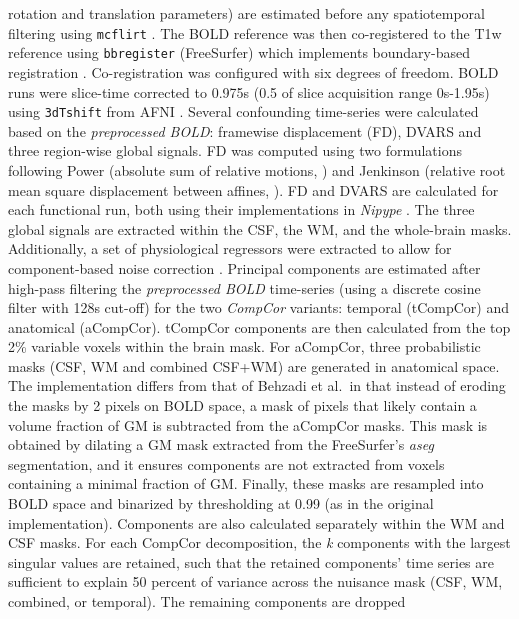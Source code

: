 \documentclass[
]{article}
\begin{document}
\begin{description}
rotation and translation parameters) are estimated before any
spatiotemporal filtering using \texttt{mcflirt} \citep[FSL
,][]{mcflirt}. The BOLD reference was then co-registered to the T1w
reference using \texttt{bbregister} (FreeSurfer) which implements
boundary-based registration \citep{bbr}. Co-registration was configured
with six degrees of freedom. BOLD runs were slice-time corrected to
0.975s (0.5 of slice acquisition range 0s-1.95s) using \texttt{3dTshift}
from AFNI \citep[RRID:SCR\_005927]{afni}. Several confounding
time-series were calculated based on the \emph{preprocessed BOLD}:
framewise displacement (FD), DVARS and three region-wise global signals.
FD was computed using two formulations following Power (absolute sum of
relative motions, \citet{power_fd_dvars}) and Jenkinson (relative root
mean square displacement between affines, \citet{mcflirt}). FD and DVARS
are calculated for each functional run, both using their implementations
in \emph{Nipype} \citep[following the definitions by][]{power_fd_dvars}.
The three global signals are extracted within the CSF, the WM, and the
whole-brain masks. Additionally, a set of physiological regressors were
extracted to allow for component-based noise correction
\citep[\emph{CompCor},][]{compcor}. Principal components are estimated
after high-pass filtering the \emph{preprocessed BOLD} time-series
(using a discrete cosine filter with 128s cut-off) for the two
\emph{CompCor} variants: temporal (tCompCor) and anatomical (aCompCor).
tCompCor components are then calculated from the top 2\% variable voxels
within the brain mask. For aCompCor, three probabilistic masks (CSF, WM
and combined CSF+WM) are generated in anatomical space. The
implementation differs from that of Behzadi et al.~in that instead of
eroding the masks by 2 pixels on BOLD space, a mask of pixels that
likely contain a volume fraction of GM is subtracted from the aCompCor
masks. This mask is obtained by dilating a GM mask extracted from the
FreeSurfer's \emph{aseg} segmentation, and it ensures components are not
extracted from voxels containing a minimal fraction of GM. Finally,
these masks are resampled into BOLD space and binarized by thresholding
at 0.99 (as in the original implementation). Components are also
calculated separately within the WM and CSF masks. For each CompCor
decomposition, the \emph{k} components with the largest singular values
are retained, such that the retained components' time series are
sufficient to explain 50 percent of variance across the nuisance mask
(CSF, WM, combined, or temporal). The remaining components are dropped

\end{description}
\end{document}
